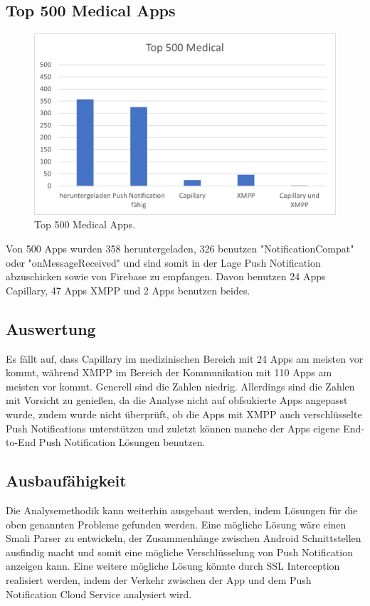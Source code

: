 \documentclass[sigconf]{acmart}
\begin{document}
\subsection{Top 500 Medical Apps}

\begin{figure}[H]
  \centering
  \includegraphics[width=\linewidth]{sample-auswertung3}
  \caption{Top 500 Medical Apps.}
\end{figure}

Von 500 Apps wurden 358 heruntergeladen, 326 benutzen "NotificationCompat" oder "onMessageReceived" 
und sind somit in der Lage Push Notification abzuschicken sowie von Firebase zu empfangen. Davon benutzen 24 Apps Capillary, 
47 Apps XMPP und 2 Apps benutzen beides.

\subsection{Auswertung}
Es fällt auf, dass Capillary im medizinischen Bereich mit 24 Apps am meisten vor kommt, während XMPP im Bereich
der Kommunikation mit 110 Apps am meisten vor kommt. Generell sind die Zahlen niedrig.
 Allerdings sind die Zahlen mit Vorsicht zu genießen, da die
Analyse nicht auf obfsukierte Apps angepasst wurde, zudem wurde nicht überprüft, ob die Apps mit XMPP auch verschlüsselte 
Push Notifications unterstützen und zuletzt können manche der Apps eigene End-to-End Push Notification Lösungen benutzen.

\subsection{Ausbaufähigkeit}
Die Analysemethodik kann weiterhin ausgebaut werden, indem Lösungen für die oben genannten Probleme gefunden werden.
Eine mögliche Lösung wäre einen Smali Parser zu entwickeln, der Zusammenhänge zwischen Android Schnittstellen ausfindig macht
und somit eine mögliche Verschlüsselung von Push Notification anzeigen kann. Eine weitere mögliche Lösung könnte durch SSL Interception
realisiert werden, indem der Verkehr zwischen der App und dem Push Notification Cloud Service analysiert wird.



\end{document}
